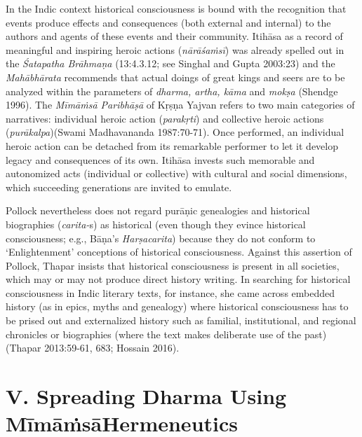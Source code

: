 In the Indic context historical consciousness is bound with the recognition that events produce effects and consequences (both external and internal) to the authors and agents of these events and their community. Itihāsa as a record of meaningful and inspiring heroic actions (\textit{nārāśaṁsī}) was already spelled out in the \textit{Śatapatha Brāhmaṇa} (13:4.3.12; see Singhal and Gupta 2003:23) and the \textit{Mahābhārata} recommends that actual doings of great kings and seers are to be analyzed within the parameters of \textit{dharma, artha, kāma} and \textit{mokṣa} (Shendge 1996). The \textit{Mīmāṁsā Paribhāṣā} of Kṛṣṇa Yajvan refers to two main categories of narratives: individual heroic action (\textit{parakṛti}) and collective heroic actions (\textit{purākalpa})(Swami Madhavananda 1987:70-71). Once performed, an individual heroic action can be detached from its remarkable performer to let it develop legacy and consequences of its own. Itihāsa invests such memorable and autonomized acts (individual or collective) with cultural and social dimensions, which succeeding generations are invited to emulate.

Pollock nevertheless does not regard purāṇic genealogies and historical biographies (\textit{carita-}s) as historical (even though they evince historical consciousness; e.g., Bāṇa’s \textit{Harṣacarita}) because they do not conform to ‘Enlightenment’ conceptions of historical consciousness. Against this assertion of Pollock, Thapar insists that historical consciousness is present in all societies, which may or may not produce direct history writing. In searching for historical consciousness in Indic literary texts, for instance, she came across embedded history (as in epics, myths and genealogy) where historical consciousness has to be prised out and externalized history such as familial, institutional, and regional chronicles or biographies (where the text makes deliberate use of the past)(Thapar 2013:59-61, 683; Hossain 2016).


\section*{V. Spreading Dharma Using Mīmāṁsā\hfill \break Hermeneutics}

